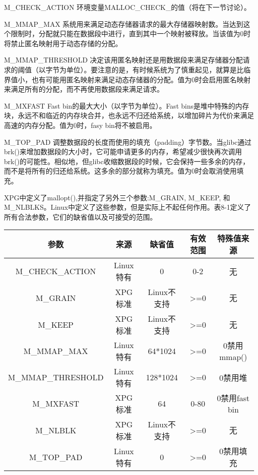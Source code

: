\begin{eqlist*}
\item[M\_CHECK\_ACTION]环境变量MALLOC\_CHECK\_的值（将在下一节讨论）。 
\item[M\_MMAP\_MAX]系统用来满足动态存储器请求的最大存储器映射数。当达到这个限制时，分配就只能在数据段中进行，直到其中一个映射被释放。当该值为0时将禁止匿名映射用于动态存储的分配。 
\item[M\_MMAP\_THRESHOLD]决定该用匿名映射还是用数据段来满足存储器分配请求的阈值（以字节为单位）。要注意的是，有时候系统为了慎重起见，就算是比临界值小，也有可能用匿名映射来满足动态存储器的分配。值为0时会启用匿名映射来满足所有的分配，而不再使用数据段来满足请求。 
\item[M\_MXFAST]Fast bin的最大大小（以字节为单位）。Fast bins是堆中特殊的内存块，永远不和临近的内存块合并，也永远不归还给系统，以增加碎片为代价来满足高速的内存分配。值为0时，fasy bin将不被启用。 
\item[M\_TOP\_PAD]调整数据段的长度而使用的填充（padding）字节数。当glibc通过brk()来增加数据段的大小时，它可能申请更多的内存，希望减少很快再次调用brk()的可能性。相似地，但glibc收缩数据段的时候，它会保持一些多余的内存，而不是将所有的归还给系统。这多余的部分就称为填充。值为0时会取消使用填充。 
\end{eqlist*}

XPG中定义了mallopt(),并指定了另外三个参数:M\_GRAIN, M\_KEEP, 和M\_NLBLKS。Linux中定义了这些参数，但是实际上不起任何作用。表8-1定义了所有合法参数，它们的缺省值以及可接受的范围。 

\begin{center}
\begin{tabular}{ccccc}
  \toprule [1pt]
  \rowcolor[gray]{.9}
    参数 & 来源 & 缺省值 & 有效范围 & 特殊值来源 \\
  \midrule
    M\_CHECK\_ACTION & Linux特有 & 0 & 0-2 & 无 \\
	M\_GRAIN & XPG标准 & Linux不支持 & >=0 & 无 \\
	M\_KEEP & XPG标准 & Linux不支持 & >=0 & 无 \\
	M\_MMAP\_MAX & Linux特有 & 64*1024 & >=0 & 0禁用mmap() \\
	M\_MMAP\_THRESHOLD & Linux特有 & 128*1024 & >=0 & 0禁用堆 \\
	M\_MXFAST & XPG标准 & 64 & 0-80 & 0禁用fast bin \\
	M\_NLBLK & XPG标准 & Linux不支持 & >=0 & 无 \\
	M\_TOP\_PAD & Linux特有 & 0 & >=0 & 0禁用填充 \\
  \bottomrule[1pt]
\end{tabular}
\end{center}

